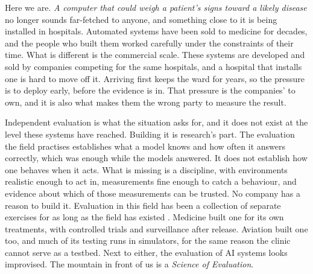\FloatBarrier

Here we are. \textit{A computer that could weigh a patient's signs toward a likely
disease} no longer sounds far-fetched to anyone, and something close to it is being
installed in hospitals. Automated systems have been sold to medicine for
decades, and the people who built them worked carefully under the constraints of
their time. What is different is the commercial scale. These systems are developed
and sold by companies competing for the same hospitals, and a hospital that installs
one is hard to move off it. Arriving first keeps the ward for years, so the pressure is to
deploy early, before the evidence is in. That pressure is the companies' to own, and
it is also what makes them the wrong party to measure the result.

Independent evaluation is what the situation asks for, and it does not exist at the
level these systems have reached. Building it is research's part. The evaluation the
field practises establishes what a model knows and how often it answers correctly,
which was enough while the models answered. It does not establish how one behaves
when it acts. What is missing is a discipline, with environments
realistic enough to act in, measurements fine enough to catch a behaviour, and
evidence about which of those measurements can be trusted. No company has a reason to
build it. Evaluation in this field has been a collection of separate exercises for as
long as the field has existed \citep{truongkoyejo2026aims}. Medicine built one for its own treatments, with controlled
trials and surveillance after release. Aviation built one too, and much of its testing
runs in simulators, for the same reason the clinic cannot serve as a testbed. Next to
either, the evaluation of AI systems looks improvised. The mountain in front of us is a \textit{Science of Evaluation}.
